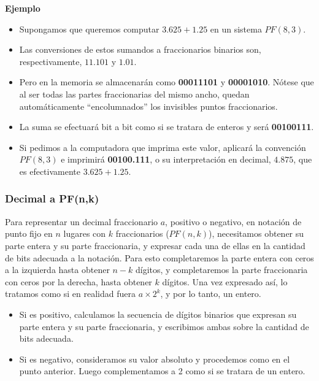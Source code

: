 \documentclass[spanish,A4,]{article}
\begin{document}
\textbf{Ejemplo}

\begin{itemize}
\itemsep1pt\parskip0pt
\item
  Supongamos que queremos computar $3.625 + 1.25$ en un sistema
  $PF(8,3)$.
\item
  Las conversiones de estos sumandos a fraccionarios binarios son,
  respectivamente, $11.101$ y $1.01$.
\item
  Pero en la memoria se almacenarán como \textbf{00011101} y
  \textbf{00001010}. Nótese que al ser todas las partes fraccionarias
  del mismo ancho, quedan automáticamente ``encolumnados'' los
  invisibles puntos fraccionarios.
\item
  La suma se efectuará bit a bit como si se tratara de enteros y será
  \textbf{00100111}.
\item
  Si pedimos a la computadora que imprima este valor, aplicará la
  convención $PF(8,3)$ e imprimirá \textbf{00100.111}, o su
  interpretación en decimal, $4.875$, que es efectivamente
  $3.625 + 1.25$.
\end{itemize}

\subsubsection{Decimal a PF(n,k)}\label{decimal-a-pfnk}

Para representar un decimal fraccionario $a$, positivo o negativo, en
notación de punto fijo en $n$ lugares con $k$ fraccionarios ($PF(n,k)$),
necesitamos obtener su parte entera y su parte fraccionaria, y expresar
cada una de ellas en la cantidad de bits adecuada a la notación. Para
esto completaremos la parte entera con ceros a la izquierda hasta
obtener $n-k$ dígitos, y completaremos la parte fraccionaria con ceros
por la derecha, hasta obtener $k$ dígitos. Una vez expresado así, lo
tratamos como si en realidad fuera $a \times 2^k$, y por lo tanto, un
entero.

\begin{itemize}
\itemsep1pt\parskip0pt
\item
  Si es positivo, calculamos la secuencia de dígitos binarios que
  expresan su parte entera y su parte fraccionaria, y escribimos ambas
  sobre la cantidad de bits adecuada.
\item
  Si es negativo, consideramos su valor absoluto y procedemos como en el
  punto anterior. Luego complementamos a 2 como si se tratara de un
  entero.
\end{itemize}
\end{document}
